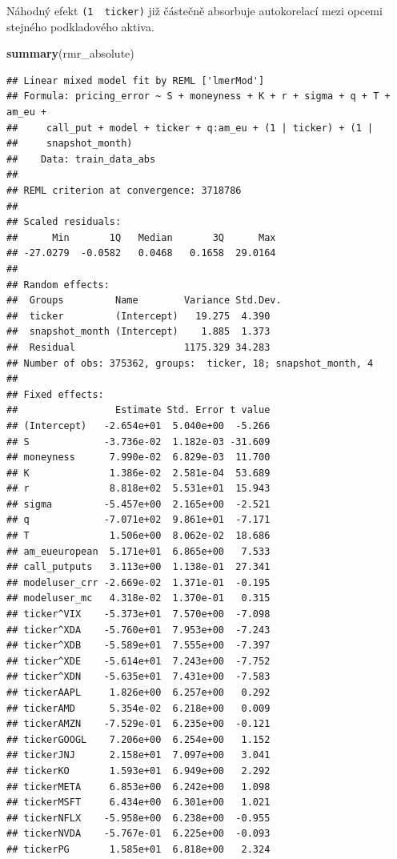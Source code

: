 \documentclass[
]{article}
\newenvironment{Shaded}{\begin{snugshade}}{\end{snugshade}}
\newcommand{\FunctionTok}[1]{\textcolor[rgb]{0.13,0.29,0.53}{\textbf{#1}}}
\newcommand{\NormalTok}[1]{#1}
\begin{document}
Náhodný efekt \texttt{(1\ \textbar{}\ ticker)} již částečně absorbuje
autokorelací mezi opcemi stejného podkladového aktiva.

\begin{Shaded}
\begin{Highlighting}[]
\FunctionTok{summary}\NormalTok{(rmr\_absolute)}
\end{Highlighting}
\end{Shaded}

\begin{verbatim}
## Linear mixed model fit by REML ['lmerMod']
## Formula: pricing_error ~ S + moneyness + K + r + sigma + q + T + am_eu +  
##     call_put + model + ticker + q:am_eu + (1 | ticker) + (1 |  
##     snapshot_month)
##    Data: train_data_abs
## 
## REML criterion at convergence: 3718786
## 
## Scaled residuals: 
##      Min       1Q   Median       3Q      Max 
## -27.0279  -0.0582   0.0468   0.1658  29.0164 
## 
## Random effects:
##  Groups         Name        Variance Std.Dev.
##  ticker         (Intercept)   19.275  4.390  
##  snapshot_month (Intercept)    1.885  1.373  
##  Residual                   1175.329 34.283  
## Number of obs: 375362, groups:  ticker, 18; snapshot_month, 4
## 
## Fixed effects:
##                 Estimate Std. Error t value
## (Intercept)   -2.654e+01  5.040e+00  -5.266
## S             -3.736e-02  1.182e-03 -31.609
## moneyness      7.990e-02  6.829e-03  11.700
## K              1.386e-02  2.581e-04  53.689
## r              8.818e+02  5.531e+01  15.943
## sigma         -5.457e+00  2.165e+00  -2.521
## q             -7.071e+02  9.861e+01  -7.171
## T              1.506e+00  8.062e-02  18.686
## am_eueuropean  5.171e+01  6.865e+00   7.533
## call_putputs   3.113e+00  1.138e-01  27.341
## modeluser_crr -2.669e-02  1.371e-01  -0.195
## modeluser_mc   4.318e-02  1.370e-01   0.315
## ticker^VIX    -5.373e+01  7.570e+00  -7.098
## ticker^XDA    -5.760e+01  7.953e+00  -7.243
## ticker^XDB    -5.589e+01  7.555e+00  -7.397
## ticker^XDE    -5.614e+01  7.243e+00  -7.752
## ticker^XDN    -5.635e+01  7.431e+00  -7.583
## tickerAAPL     1.826e+00  6.257e+00   0.292
## tickerAMD      5.354e-02  6.218e+00   0.009
## tickerAMZN    -7.529e-01  6.235e+00  -0.121
## tickerGOOGL    7.206e+00  6.254e+00   1.152
## tickerJNJ      2.158e+01  7.097e+00   3.041
## tickerKO       1.593e+01  6.949e+00   2.292
## tickerMETA     6.853e+00  6.242e+00   1.098
## tickerMSFT     6.434e+00  6.301e+00   1.021
## tickerNFLX    -5.958e+00  6.238e+00  -0.955
## tickerNVDA    -5.767e-01  6.225e+00  -0.093
## tickerPG       1.585e+01  6.818e+00   2.324
\end{verbatim}
\end{document}
